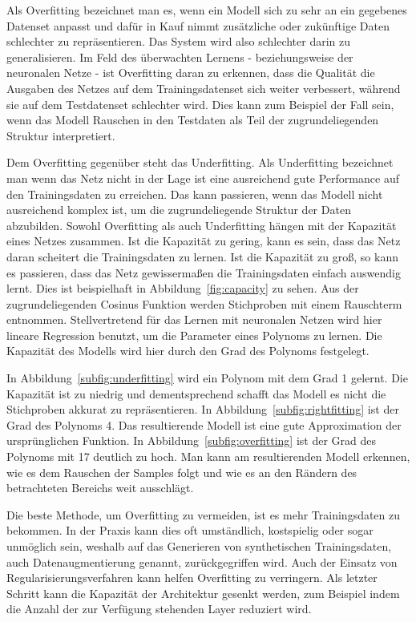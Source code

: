 Als Overfitting bezeichnet man es, wenn ein Modell sich zu sehr an ein gegebenes Datenset anpasst und 
dafür in Kauf nimmt zusätzliche oder zukünftige Daten schlechter zu repräsentieren.
Das System wird also schlechter darin zu generalisieren.
Im Feld des überwachten Lernens - beziehungsweise der neuronalen Netze - ist Overfitting daran zu erkennen,
dass die Qualität die Ausgaben des Netzes auf dem Trainingsdatenset sich weiter verbessert,
während sie auf dem Testdatenset schlechter wird.
Dies kann zum Beispiel der Fall sein, wenn das Modell Rauschen in den Testdaten als Teil der zugrundeliegenden Struktur interpretiert. 


Dem Overfitting gegenüber steht das Underfitting. 
Als Underfitting bezeichnet man wenn das Netz nicht in der Lage ist
eine ausreichend gute Performance auf den Trainingsdaten zu erreichen.
Das kann passieren, wenn das Modell nicht ausreichend komplex ist, um die zugrundeliegende Struktur der Daten abzubilden.
Sowohl Overfitting als auch Underfitting hängen mit der Kapazität eines Netzes zusammen.
Ist die Kapazität zu gering, kann es sein, dass das Netz daran scheitert die Trainingsdaten zu lernen.
Ist die Kapazität zu groß, so kann es passieren, dass das Netz gewissermaßen die Trainingsdaten einfach auswendig lernt.
Dies ist beispielhaft in Abbildung~\ref{fig:capacity} zu sehen.
Aus der zugrundeliegenden Cosinus Funktion werden Stichproben mit einem Rauschterm entnommen. 
Stellvertretend für das Lernen mit neuronalen Netzen wird hier lineare Regression benutzt,
um die Parameter eines Polynoms zu lernen.
Die Kapazität des Modells wird hier durch den Grad des Polynoms festgelegt.

In Abbildung~\ref{subfig:underfitting} wird ein Polynom mit dem Grad 1 gelernt.
Die Kapazität ist zu niedrig und dementsprechend schafft das Modell es nicht die Stichproben akkurat zu repräsentieren.
In Abbildung~\ref{subfig:rightfitting} ist der Grad des Polynoms 4.
Das resultierende Modell ist eine gute Approximation der ursprünglichen Funktion.
In Abbildung~\ref{subfig:overfitting} ist der Grad des Polynoms mit 17 deutlich zu hoch.
Man kann am resultierenden Modell erkennen, wie es dem Rauschen der Samples folgt und wie es an den Rändern des betrachteten Bereichs weit ausschlägt.

Die beste Methode, um Overfitting zu vermeiden, ist es mehr Trainingsdaten zu bekommen.
In der Praxis kann dies oft umständlich, kostspielig oder sogar unmöglich sein, 
weshalb auf das Generieren von synthetischen Trainingsdaten, auch Datenaugmentierung genannt, zurückgegriffen wird.
Auch der Einsatz von Regularisierungsverfahren kann helfen Overfitting zu verringern.
Als letzter Schritt kann die Kapazität der Architektur gesenkt werden,
zum Beispiel indem die Anzahl der zur Verfügung stehenden Layer reduziert wird.


